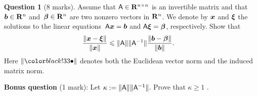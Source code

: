 \documentclass[11pt]{article}
\theoremstyle{definition}
\newtheorem{question}{Question}
\begin{document}
\newpage
\begin{question}
    [8 marks]
    Assume that $\mathsf A \in \mathbf R^{n \times n}$ is an invertible matrix
    and that $\mathbf{\boldsymbol{b}} \in \mathbf R^n$ and~$\mathbf{\boldsymbol{\beta}} \in \mathbf R^n$ are two nonzero vectors in $\mathbf R^n$.
    We denote by $\mathbf{\boldsymbol{x}}$ and $\mathbf{\boldsymbol{\xi}}$ the solutions to the linear equations~$\mathsf A \mathbf{\boldsymbol{x}} = \mathbf{\boldsymbol{b}}$ and $\mathsf A \mathbf{\boldsymbol{\xi}} = \mathbf{\boldsymbol{\beta}}$,
    respectively.
    Show that
    \[
        \frac{\lVert\mathbf{\boldsymbol{x}} - \mathbf{\boldsymbol{\xi}}\rVert}{\lVert\mathbf{\boldsymbol{x}}\rVert} \leqslant \lVert\mathsf A\rVert \lVert\mathsf A^{-1}\rVert \frac{\lVert\mathbf{\boldsymbol{b}} - \mathbf{\boldsymbol{\beta}}\rVert}{\lVert\mathbf{\boldsymbol{b}}\rVert}.
    \]
    Here $\norm{\placeholder}$ denotes both the Euclidean vector norm and the induced matrix norm.

    \noindent \textbf{Bonus question} (1 mark): Let $\kappa := \lVert\mathsf A\rVert \lVert\mathsf A^{-1}\rVert$. Prove that $\kappa \geq 1$ .
\end{question}
\end{document}
